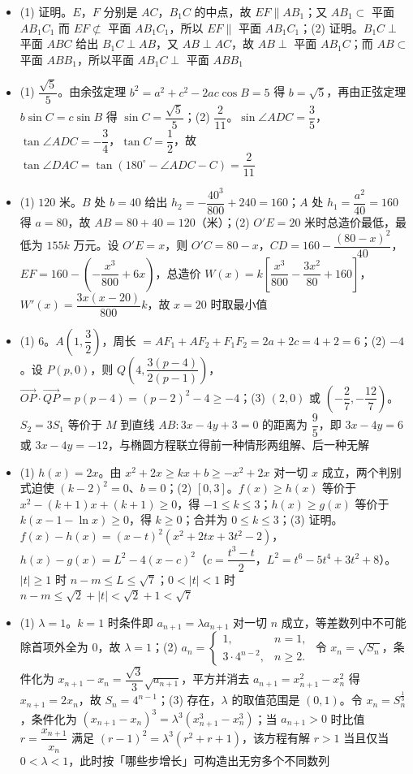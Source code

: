 \begin{itemize}[leftmargin=2.6em]
  \item[\textbf{15.}] (1) 证明。$E$，$F$ 分别是 $AC$，$B_1C$ 的中点，故 $EF\parallel AB_1$；又 $AB_1\subset$ 平面 $AB_1C_1$ 而 $EF\not\subset$ 平面 $AB_1C_1$，所以 $EF\parallel$ 平面 $AB_1C_1$；(2) 证明。$B_1C\perp$ 平面 $ABC$ 给出 $B_1C\perp AB$，又 $AB\perp AC$，故 $AB\perp$ 平面 $AB_1C$；而 $AB\subset$ 平面 $ABB_1$，所以平面 $AB_1C\perp$ 平面 $ABB_1$
  \item[\textbf{16.}] (1) $\dfrac{\sqrt5}5$。由余弦定理 $b^2=a^2+c^2-2ac\cos B=5$ 得 $b=\sqrt5$，再由正弦定理 $b\sin C=c\sin B$ 得 $\sin C=\dfrac{\sqrt5}5$；(2) $\dfrac2{11}$。$\sin\angle ADC=\dfrac35$，$\tan\angle ADC=-\dfrac34$，$\tan C=\dfrac12$，故 $\tan\angle DAC=\tan\left(180^\circ-\angle ADC-C\right)=\dfrac2{11}$
  \item[\textbf{17.}] (1) $120$ 米。$B$ 处 $b=40$ 给出 $h_2=-\dfrac{40^3}{800}+240=160$；$A$ 处 $h_1=\dfrac{a^2}{40}=160$ 得 $a=80$，故 $AB=80+40=120$（米）；(2) $O'E=20$ 米时总造价最低，最低为 $155k$ 万元。设 $O'E=x$，则 $O'C=80-x$，$CD=160-\dfrac{(80-x)^2}{40}$，$EF=160-\left(-\dfrac{x^3}{800}+6x\right)$，总造价 $W(x)=k\left[\dfrac{x^3}{800}-\dfrac{3x^2}{80}+160\right]$，$W'(x)=\dfrac{3x(x-20)}{800}k$，故 $x=20$ 时取最小值
  \item[\textbf{18.}] (1) $6$。$A\left(1,\dfrac32\right)$，周长 $=AF_1+AF_2+F_1F_2=2a+2c=4+2=6$；(2) $-4$。设 $P(p,0)$，则 $Q\left(4,\dfrac{3(p-4)}{2(p-1)}\right)$，$\overrightarrow{OP}\cdot\overrightarrow{QP}=p(p-4)=(p-2)^2-4\geqslant-4$；(3) $(2,0)$ 或 $\left(-\dfrac27,-\dfrac{12}7\right)$。$S_2=3S_1$ 等价于 $M$ 到直线 $AB:3x-4y+3=0$ 的距离为 $\dfrac95$，即 $3x-4y=6$ 或 $3x-4y=-12$，与椭圆方程联立得前一种情形两组解、后一种无解
  \item[\textbf{19.}] (1) $h(x)=2x$。由 $x^2+2x\geqslant kx+b\geqslant-x^2+2x$ 对一切 $x$ 成立，两个判别式迫使 $(k-2)^2=0$、$b=0$；(2) $[0,3]$。$f(x)\geqslant h(x)$ 等价于 $x^2-(k+1)x+(k+1)\geqslant0$，得 $-1\leqslant k\leqslant3$；$h(x)\geqslant g(x)$ 等价于 $k(x-1-\ln x)\geqslant0$，得 $k\geqslant0$；合并为 $0\leqslant k\leqslant3$；(3) 证明。$f(x)-h(x)=(x-t)^2\left(x^2+2tx+3t^2-2\right)$，$h(x)-g(x)=L^2-4(x-c)^2$（$c=\dfrac{t^3-t}2$，$L^2=t^6-5t^4+3t^2+8$）。$|t|\geqslant1$ 时 $n-m\leqslant L\leqslant\sqrt7$；$0<|t|<1$ 时 $n-m\leqslant\sqrt2+|t|<\sqrt2+1<\sqrt7$
  \item[\textbf{20.}] (1) $\lambda=1$。$k=1$ 时条件即 $a_{n+1}=\lambda a_{n+1}$ 对一切 $n$ 成立，等差数列中不可能除首项外全为 $0$，故 $\lambda=1$；(2) $a_n=\begin{cases}1,&n=1,\\3\cdot4^{n-2},&n\geqslant2.\end{cases}$ 令 $x_n=\sqrt{S_n}$，条件化为 $x_{n+1}-x_n=\dfrac{\sqrt3}3\sqrt{a_{n+1}}$，平方并消去 $a_{n+1}=x_{n+1}^2-x_n^2$ 得 $x_{n+1}=2x_n$，故 $S_n=4^{n-1}$；(3) 存在，$\lambda$ 的取值范围是 $(0,1)$。令 $x_n=S_n^{\frac13}$，条件化为 $(x_{n+1}-x_n)^3=\lambda^3\left(x_{n+1}^3-x_n^3\right)$；当 $a_{n+1}>0$ 时比值 $r=\dfrac{x_{n+1}}{x_n}$ 满足 $(r-1)^2=\lambda^3(r^2+r+1)$，该方程有解 $r>1$ 当且仅当 $0<\lambda<1$，此时按「哪些步增长」可构造出无穷多个不同数列
\end{itemize}

